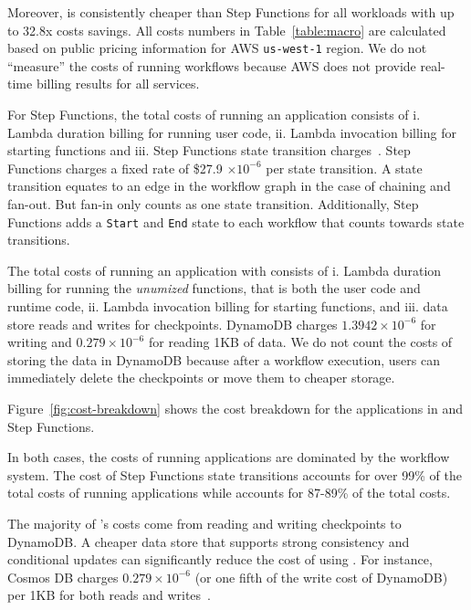 Moreover, \name{} is consistently cheaper than Step Functions for all
workloads with up to 32.8x costs savings. All costs numbers in
Table~\ref{table:macro} are calculated based on public pricing information for
AWS \texttt{us-west-1} region. We do not ``measure'' the costs of running
workflows because AWS does not provide real-time billing results for all
services.

For Step Functions, the total costs of running an application consists of i.
Lambda duration billing for running user code, ii. Lambda invocation billing
for starting functions and iii. Step Functions state transition
charges~\cite{aws-step-functions-pricing}. Step Functions charges a fixed rate
of \$27.9 $ \times 10^{-6}$ per state transition. A state transition equates
to an edge in the workflow graph in the case of chaining and fan-out. But
fan-in only counts as one state transition. Additionally, Step Functions adds
a \texttt{Start} and \texttt{End} state to each workflow that counts towards
state transitions.

The total costs of running an application with \name{} consists of i. Lambda
duration billing for running the \emph{unumized} functions, that is both the
user code and \name{} runtime code, ii. Lambda invocation billing for starting
functions, and iii. data store reads and writes for checkpoints. DynamoDB
charges $1.3942 \times 10^{-6}$ for writing and $0.279
\times 10^{-6}$ for reading 1KB of data. We do not count the costs of storing
the data in DynamoDB because after a workflow execution, users can immediately
delete the checkpoints or move them to cheaper storage.

Figure~\ref{fig:cost-breakdown} shows the cost breakdown for the applications
in \name{} and Step Functions.


In both cases, the costs of running applications are dominated by the workflow
system. The cost of Step Functions state transitions accounts for over 99\% of
the total costs of running applications while \name{} accounts for 87-89\% of
the total costs.

The majority of \name{}'s costs come from reading and writing checkpoints to
DynamoDB. A cheaper data store that supports strong consistency and
conditional updates can significantly reduce the cost of using \name{}. For
instance, Cosmos DB charges $0.279 \times 10^{-6}$ (or one fifth of the write
cost of DynamoDB) per 1KB for both reads and writes~\cite{cosmosdb-pricing}.


